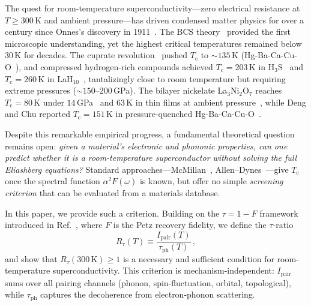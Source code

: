 \documentclass[prb,twocolumn,superscriptaddress,longbibliography,floatfix]{revtex4-2}
\newcommand{\tauasym}{\tau}
\newcommand{\taudec}{\tauasym_{\mathrm{ph}}}
\newcommand{\Ipair}{I_{\mathrm{pair}}}
\newcommand{\Rtau}{R_{\tauasym}}
\newcommand{\Tc}{T_{\mathrm{c}}}
\begin{document}
The quest for room-temperature superconductivity---zero electrical
resistance at $T \geq 300\,$K and ambient pressure---has driven
condensed matter physics for over a century since Onnes's discovery
in 1911~\cite{Onnes1911}.  The BCS theory~\cite{BCS1957} provided the
first microscopic understanding, yet the highest critical temperatures
remained below $30\,$K for decades.  The cuprate
revolution~\cite{Bednorz1986} pushed $\Tc$ to $\sim 135\,$K
(Hg-Ba-Ca-Cu-O~\cite{Schilling1993}), and compressed hydrogen-rich
compounds achieved $\Tc = 203\,$K in H$_3$S~\cite{Drozdov2015}
and $\Tc = 260\,$K in LaH$_{10}$~\cite{Somayazulu2019}, tantalizingly
close to room temperature but requiring extreme pressures
($\sim 150$--$200\,$GPa).  The bilayer nickelate
La$_3$Ni$_2$O$_7$ reaches $\Tc = 80\,$K under $14\,$GPa~\cite{Sun2023}
and $63\,$K in thin films at ambient pressure~\cite{Ko2024},
while Deng and Chu reported $\Tc = 151\,$K in pressure-quenched
Hg-Ba-Ca-Cu-O~\cite{DengChu2026}.

Despite this remarkable empirical progress, a fundamental theoretical
question remains open: \emph{given a material's electronic and
phononic properties, can one predict whether it is a room-temperature
superconductor without solving the full Eliashberg equations?}
Standard approaches---McMillan~\cite{McMillan1968},
Allen--Dynes~\cite{Allen1975}---give $\Tc$ once the spectral
function $\alpha^2 F(\omega)$ is known, but offer no simple
\emph{screening criterion} that can be evaluated from a
materials database.

In this paper, we provide such a criterion.  Building on the
$\tauasym = 1 - F$ framework introduced in Ref.~\cite{Huang2026},
where $F$ is the Petz recovery fidelity, we define the
$\tauasym$-ratio
\begin{equation}\label{eq:Rtau_intro}
  \Rtau(T) \equiv \frac{\Ipair(T)}{\taudec(T)}\,,
\end{equation}
and show that $\Rtau(300\,\mathrm{K}) \geq 1$ is a necessary and
sufficient condition for room-temperature superconductivity.
This criterion is mechanism-independent: $\Ipair$ sums over
all pairing channels (phonon, spin-fluctuation, orbital,
topological), while $\taudec$ captures the decoherence from
electron-phonon scattering.
\end{document}
